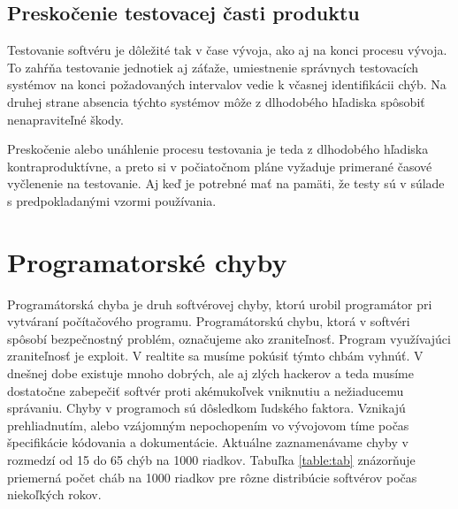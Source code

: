 \documentclass[10pt,twoside,slovak,a4paper]{article}
\begin{document}
\subsection{Preskočenie testovacej časti produktu}
Testovanie softvéru je dôležité tak v čase vývoja, ako aj na konci procesu vývoja. To zahŕňa testovanie jednotiek aj záťaže, umiestnenie správnych testovacích systémov na konci požadovaných intervalov vedie k včasnej identifikácii chýb. Na druhej strane absencia týchto systémov môže z dlhodobého hľadiska spôsobiť nenapraviteľné škody.

Preskočenie alebo unáhlenie procesu testovania je teda z dlhodobého hľadiska kontraproduktívne, a preto si v počiatočnom pláne vyžaduje primerané časové vyčlenenie na testovanie. Aj keď je potrebné mať na pamäti, že testy sú v súlade s predpokladanými vzormi používania.











\section{Programatorské chyby}
Programátorská chyba je druh softvérovej chyby, ktorú urobil programátor pri vytváraní počítačového programu. Programátorskú chybu, ktorá v softvéri spôsobí bezpečnostný problém, označujeme ako zraniteľnosť. Program využívajúci zraniteľnosť je exploit. V realtite sa musíme pokúsiť týmto chbám vyhnúť. V dnešnej dobe existuje mnoho dobrých, ale aj zlých hackerov a teda musíme dostatočne zabepečiť softvér proti akémukoľvek vniknutiu a nežiaducemu správaniu.
Chyby v programoch sú dôsledkom ľudského faktora. Vznikajú prehliadnutím, alebo vzájomným nepochopením vo vývojovom tíme počas špecifikácie kódovania a dokumentácie.
Aktuálne zaznamenávame chyby v rozmedzí od 15 do 65 chýb na 1000 riadkov.
Tabuľka \ref{table:tab} znázorňuje priemerná počet cháb na 1000 riadkov pre rôzne distribúcie softvérov počas niekoľkých rokov.
\end{document}
